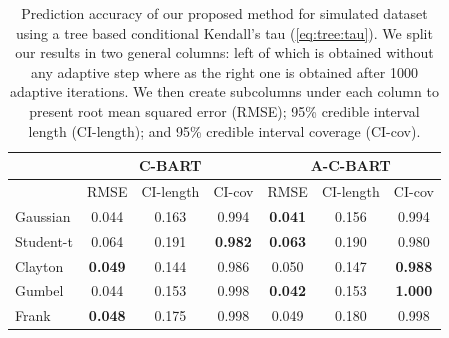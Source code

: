 \documentclass{amsart}
\begin{document}
\begin{table}[ht]
	\centering
	\begin{tabular}{l|ccc|ccc}
		\multicolumn{1}{c|}{} &
		\multicolumn{3}{c|}{C-BART} &
		\multicolumn{3}{c}{A-C-BART} \\
		\midrule
		& RMSE & CI-length & CI-cov & RMSE & CI-length & CI-cov \\ 
		\midrule
		Gaussian & 0.044 & 0.163 & 0.994 & \textbf{0.041} & 0.156 & 0.994 \\ 
		Student-t & 0.064 & 0.191 & \textbf{0.982} & \textbf{0.063} & 0.190 & 0.980 \\ 
		Clayton & \textbf{0.049} & 0.144 & 0.986 & 0.050 & 0.147 & \textbf{0.988} \\ 
		Gumbel & 0.044 & 0.153 & 0.998 & \textbf{0.042} & 0.153 & \textbf{1.000} \\ 
		Frank & \textbf{0.048} & 0.175 & 0.998 & 0.049 & 0.180 & 0.998 \\ 
	\end{tabular}
	\caption{Prediction accuracy of our proposed method for simulated dataset using a tree based conditional Kendall's tau (\cref{eq:tree:tau}). We split our results in two general columns: left of which is obtained without any adaptive step where as the right one is obtained after 1000 adaptive iterations. We then create subcolumns under each column to present root mean squared error (RMSE); 95\% credible interval length (CI-length); and 95\% credible interval coverage (CI-cov).}
	\label{tab:pred:ex1}
\end{table}
\end{document}

